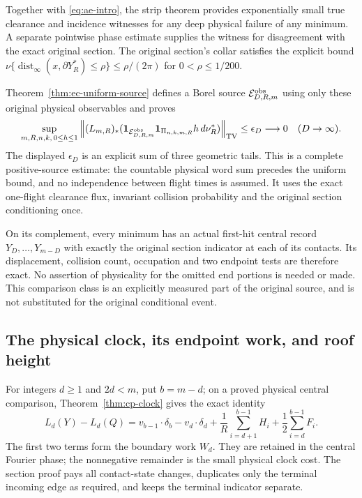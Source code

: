\documentclass[11pt,reqno]{amsart}
\numberwithin{equation}{section}
\theoremstyle{definition}\newtheorem{definition}[theorem]{Definition}
\theoremstyle{remark}\newtheorem{remark}[theorem]{Remark}
\newcommand{\one}{\mathbf1}\newcommand{\dd}{\,\mathrm d}
\begin{document}
Together with \eqref{eq:ae-intro}, the strip theorem provides
exponentially small true clearance and incidence witnesses for any
deep physical failure of any minimum.  A separate pointwise phase
estimate supplies the witness for disagreement with the exact
original section.  The original section's collar satisfies the
explicit bound $\nu\{\operatorname{dist}_\infty
 (x,\partial Y_R^*)\le\rho\}\le\rho/(2\pi)$ for
$0<\rho\le1/200$.

Theorem~\ref{thm:ec-uniform-source} defines a Borel source
$\mathcal E^{\rm obs}_{D,R,m}$ using only these original physical
observables and proves
\[
 \sup_{m,R,n,k,\,0\le h\le1}
 \left\|(L_{m,R})_*
  (\one_{\mathcal E^{\rm obs}_{D,R,m}}\one_{\Pi_{n,k,m,R}}
                                  h\,d\nu_R^*)\right\|_{\rm TV}
 \le\epsilon_D\longrightarrow0\quad(D\to\infty).
\]
The displayed $\epsilon_D$ is an explicit sum of three geometric
tails.  This is a complete positive-source estimate: the countable
physical word sum precedes the uniform bound, and no independence
between flight times is assumed.  It uses the exact one-flight
clearance flux, invariant collision probability and the original
section conditioning once.

On its complement, every minimum has an actual first-hit central
record $Y_D,\ldots,Y_{m-D}$ with exactly the original section
indicator at each of its contacts.  Its displacement, collision
count, occupation and two endpoint tests are therefore exact.
No assertion of physicality for the omitted end portions is needed
or made.  This comparison class is an explicitly measured part of
the original source, and is not substituted for the original
conditional event.

\subsection*{The physical clock, its endpoint work, and roof height}
For integers $d\ge1$ and $2d<m$, put $b=m-d$; on a proved
physical central comparison,
Theorem~\ref{thm:cp-clock} gives the exact identity
\[
 L_d(Y)-L_d(Q)
   =v_{b-1}\cdot\delta_b-v_d\cdot\delta_d
     +\frac1R\sum_{i=d+1}^{b-1}H_i
                    +\frac12\sum_{i=d}^{b-1}F_i .
\]
The first two terms form the boundary work $W_d$.  They are
retained in the central Fourier phase; the nonnegative remainder
is the small physical clock cost.  The section proof pays all
contact-state changes, duplicates only the terminal incoming edge
as required, and keeps the terminal indicator separate.
\end{document}
